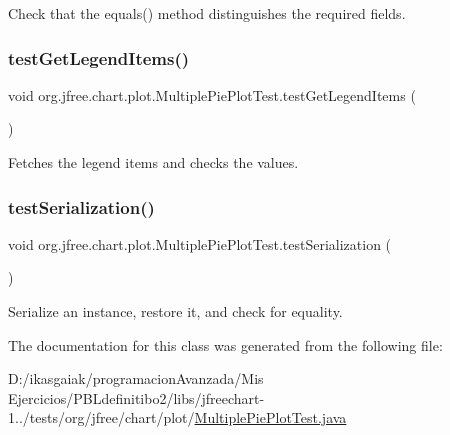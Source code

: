 Check that the equals() method distinguishes the required fields. \mbox{\label{classorg_1_1jfree_1_1chart_1_1plot_1_1_multiple_pie_plot_test_a94c79934d54367253f604f879f7fdb86}} 
\subsubsection{\texorpdfstring{test\+Get\+Legend\+Items()}{testGetLegendItems()}}
{\footnotesize\ttfamily void org.\+jfree.\+chart.\+plot.\+Multiple\+Pie\+Plot\+Test.\+test\+Get\+Legend\+Items (\begin{DoxyParamCaption}{ }\end{DoxyParamCaption})}

Fetches the legend items and checks the values. \mbox{\label{classorg_1_1jfree_1_1chart_1_1plot_1_1_multiple_pie_plot_test_a0eedb0031631e9d5b125b4dd44a58bc8}} 
\subsubsection{\texorpdfstring{test\+Serialization()}{testSerialization()}}
{\footnotesize\ttfamily void org.\+jfree.\+chart.\+plot.\+Multiple\+Pie\+Plot\+Test.\+test\+Serialization (\begin{DoxyParamCaption}{ }\end{DoxyParamCaption})}

Serialize an instance, restore it, and check for equality. 

The documentation for this class was generated from the following file\+:\begin{DoxyCompactItemize}
\item 
D\+:/ikasgaiak/programacion\+Avanzada/\+Mis Ejercicios/\+P\+B\+Ldefinitibo2/libs/jfreechart-\/1../tests/org/jfree/chart/plot/\mbox{\hyperlink{_multiple_pie_plot_test_8java}{Multiple\+Pie\+Plot\+Test.\+java}}\end{DoxyCompactItemize}
